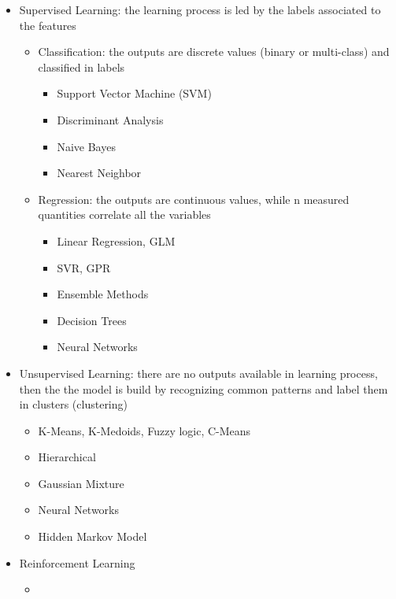 \documentclass[11pt]{article}
\begin{document}
        \begin{itemize}
            \item Supervised Learning: the learning process is led by the labels associated to the features
                \begin{itemize}
                    \item Classification: the outputs are discrete values (binary or multi-class) and classified in labels
                    \begin{itemize}
                        \item Support Vector Machine (SVM)
                        \item Discriminant Analysis
                        \item Naive Bayes
                        \item Nearest Neighbor
                    \end{itemize}
                    \item Regression: the outputs are continuous values, while n measured quantities correlate all the variables
                    \begin{itemize}
                        \item Linear Regression, GLM
                        \item SVR, GPR
                        \item Ensemble Methods
                        \item Decision Trees
                        \item Neural Networks
                    \end{itemize}
                \end{itemize}
            \item Unsupervised Learning: there are no outputs available in learning process, then the the model is build by recognizing common patterns and label them in clusters (clustering)
                \begin{itemize}
                    \item K-Means, K-Medoids, Fuzzy logic, C-Means
                    \item Hierarchical
                    \item Gaussian Mixture
                    \item Neural Networks
                    \item Hidden Markov Model
                \end{itemize}
            \item Reinforcement Learning
                \begin{itemize}
                    \item 
                \end{itemize}
        \end{itemize}
    
\end{document}
